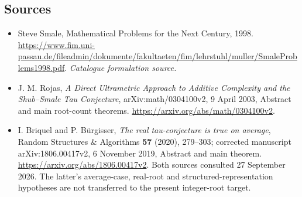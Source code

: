 \documentclass[11pt,a4paper]{article}
\numberwithin{equation}{section}
\begin{document}
\subsection{Sources}
\begin{itemize}\raggedright
\item[\textnormal{[S1]}]\hypertarget{source:20002353:1}{} Steve Smale, Mathematical Problems for the Next Century, 1998.
\url{https://www.fim.uni-passau.de/fileadmin/dokumente/fakultaeten/fim/lehrstuhl/muller/SmaleProblems1998.pdf}.
{\small\textit{Catalogue formulation source.}}
\item[\textnormal{[E1]}]\hypertarget{extra:20002353:1}{}
J. M. Rojas, \emph{A Direct Ultrametric Approach to Additive Complexity
and the Shub--Smale Tau Conjecture}, arXiv:math/0304100v2, 9 April 2003,
Abstract and main root-count theorems.
\url{https://arxiv.org/abs/math/0304100v2}.
\item[\textnormal{[E2]}]\hypertarget{extra:20002353:2}{}
I. Briquel and P. B\"urgisser, \emph{The real tau-conjecture is true on
average}, Random Structures \& Algorithms \textbf{57} (2020), 279--303;
corrected manuscript arXiv:1806.00417v2, 6 November 2019, Abstract and
main theorem. \url{https://arxiv.org/abs/1806.00417v2}.
Both sources consulted 27 September 2026. The latter's average-case,
real-root and structured-representation hypotheses are not transferred
to the present integer-root target.
\end{itemize}
\end{document}
